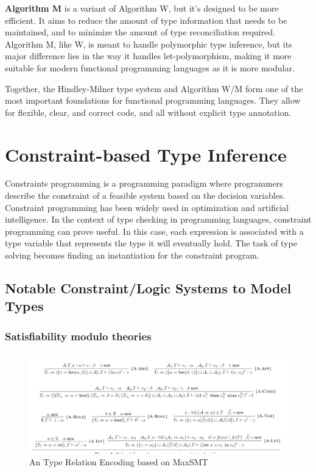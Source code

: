 \textbf{Algorithm M} is a variant of Algorithm W, but it's designed to be more efficient. It aims to reduce the amount of type information that needs to be maintained, and to minimize the amount of type reconciliation required. Algorithm M, like W, is meant to handle polymorphic type inference, but its major difference lies in the way it handles let-polymorphism, making it more suitable for modern functional programming languages as it is more modular.


Together, the Hindley-Milner type system and Algorithm W/M form one of the most important foundations for functional programming languages. They allow for flexible, clear, and correct code, and all without explicit type annotation.

\section{Constraint-based Type Inference}

Constraints programming is a programming paradigm where programmers describe the constraint of a feasible system based on the decision variables. Constraint programming has been widely used in optimization and artificial intelligence. In the context of type checking in programming languages, constraint programming can prove useful. In this case, each expression is associated with a type variable that represents the type it will eventually hold. The task of type solving becomes finding an instantiation for the constraint program.

\subsection{Notable Constraint/Logic Systems to Model Types}

\subsubsection{Satisfiability modulo theories}


\begin{figure}
  \includegraphics[width=\linewidth]{MaxSMT}
  \caption{An Type Relation Encoding based on MaxSMT}
\end{figure}

